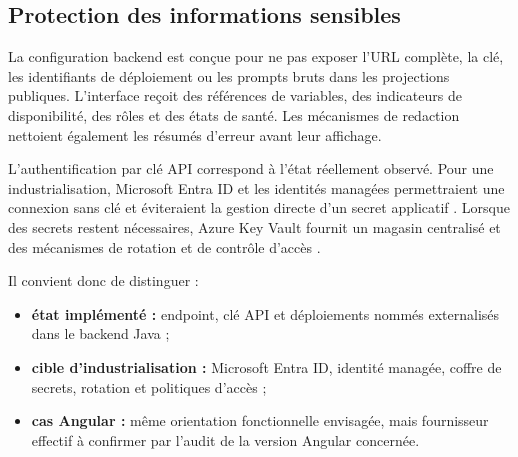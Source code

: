 \subsection{Protection des informations sensibles}

La configuration backend est conçue pour ne pas exposer l'URL complète, la clé, les identifiants de déploiement ou les prompts bruts dans les projections publiques. L'interface reçoit des références de variables, des indicateurs de disponibilité, des rôles et des états de santé. Les mécanismes de redaction nettoient également les résumés d'erreur avant leur affichage.

L'authentification par clé API correspond à l'état réellement observé. Pour une industrialisation, Microsoft Entra ID et les identités managées permettraient une connexion sans clé et éviteraient la gestion directe d'un secret applicatif \cite{azure-entra-auth}. Lorsque des secrets restent nécessaires, Azure Key Vault fournit un magasin centralisé et des mécanismes de rotation et de contrôle d'accès \cite{azure-key-vault-secrets}.

Il convient donc de distinguer :

\begin{itemize}
    \item \textbf{état implémenté :} endpoint, clé API et déploiements nommés externalisés dans le backend Java ;
    \item \textbf{cible d'industrialisation :} Microsoft Entra ID, identité managée, coffre de secrets, rotation et politiques d'accès ;
    \item \textbf{cas Angular :} même orientation fonctionnelle envisagée, mais fournisseur effectif à confirmer par l'audit de la version Angular concernée.
\end{itemize}
